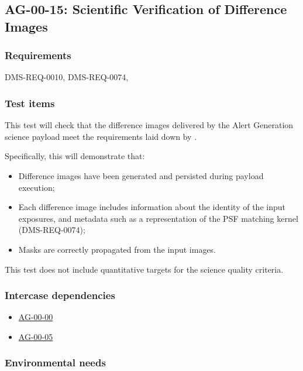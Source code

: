 \subsection{AG-00-15: Scientific Verification of Difference Images}
\label{ag-00-15}

\subsubsection{Requirements}

DMS-REQ-0010, DMS-REQ-0074, 

\subsubsection{Test items}
\label{ag-00-15-items}

This test will check that the difference images delivered by the
Alert Generation science payload meet the requirements laid down by .

Specifically, this will demonstrate that:

\begin{itemize}

  \item{Difference images have been generated and persisted during
  payload execution;}
  \item{Each difference image includes information about the identity of
	the input exposures, and metadata such as a representation of the
		PSF matching kernel (DMS-REQ-0074);}
  \item{Masks are correctly propagated from the input images.}

\end{itemize}

This test does not include quantitative targets for the science quality criteria.

\subsubsection{Intercase dependencies}

\begin{itemize}

  \item{\hyperref[ag-00-00]{AG-00-00}}
  \item{\hyperref[ag-00-05]{AG-00-05}}

\end{itemize}

\subsubsection{Environmental needs}

